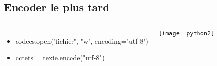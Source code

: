 \subsection{Encoder le plus tard}
\frame
{
    \begin{columns}[c]
            \begin{itemize}
            \item codecs.open("fichier", "w", encoding="utf-8")
            \item octets = texte.encode("utf-8")
            \end{itemize}
            \texttt{[image: python2]}
    \end{columns}
}

